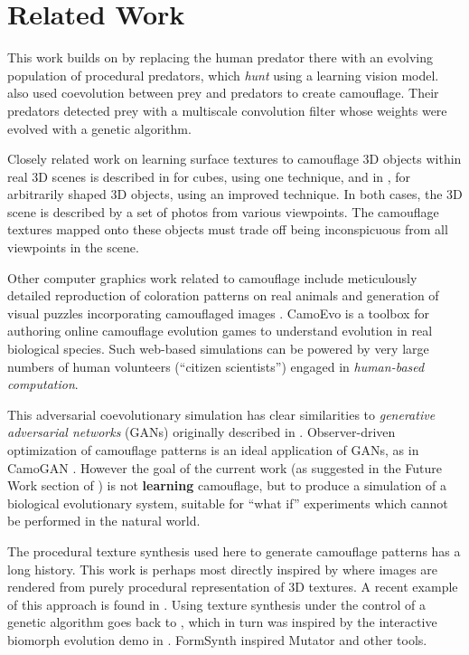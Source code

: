\documentclass[letterpaper]{article}
\newcommand{\jargon}[1]{\textit{#1}}
\begin{document}
\section{Related Work}
This work builds on \citet{reynolds_iec_2011} by replacing the human predator there with an evolving population of procedural predators, which \jargon{hunt} using a learning vision model. \citet{harrington_coevolution_2014} also used coevolution between prey and predators to create camouflage. Their predators detected prey with a multiscale convolution filter whose weights were evolved with a genetic algorithm.
\par
Closely related work on learning surface textures to camouflage 3D objects within real 3D scenes is described in \citet{owens_camouflaging_2014} for cubes, using one technique, and in \citet{guo_ganmouflage_2022}, for arbitrarily shaped 3D objects, using an improved technique. In both cases, the 3D scene is described by a set of photos from various viewpoints. The camouflage textures mapped onto these objects must trade off being inconspicuous from all viewpoints in the scene.
\par
Other computer graphics work related to camouflage include meticulously detailed reproduction of coloration patterns on real animals \cite{de_gomensoro_malheiros_leopard_2020} and generation of visual puzzles incorporating camouflaged images \cite{chu_camo_image_2010} \cite{Zhang_Yin_Nie_Zheng_2020}. CamoEvo \cite{hancock_camoevo_2022} is a toolbox for authoring online camouflage evolution games to understand evolution in real biological species. Such web-based simulations can be powered by very large numbers of human volunteers (“citizen scientists”) engaged in \jargon{human-based computation}.
\par
This adversarial coevolutionary simulation has clear similarities to \jargon{generative adversarial networks} (GANs) originally described in \citet{goodfellow_gan_2014}. Observer-driven optimization of camouflage patterns is an ideal application of GANs, as in CamoGAN \cite{talas_camogan_2020}. However the goal of the current work (as suggested in the Future Work section of \citet{reynolds_iec_2011}) is not \textbf{learning} camouflage, but to produce a simulation of a biological evolutionary system, suitable for “what if” experiments which cannot be performed in the natural world.
\par
The procedural texture synthesis used here to generate camouflage patterns has a long history. This work is perhaps most directly inspired by \citet{perlin_image_1985} where images are rendered from purely procedural representation of 3D textures. A recent example of this approach is found in \citet{Guerrero_MatFormer_2022}. Using texture synthesis under the control of a genetic algorithm goes back to \citet{sims_artificial_1991}, which in turn was inspired by the interactive biomorph evolution demo in \citet{dawkins_blind_1986}. FormSynth \cite{latham_form_1989} inspired Mutator \cite{todd_evolutionary_1994} and other tools.
\end{document}
